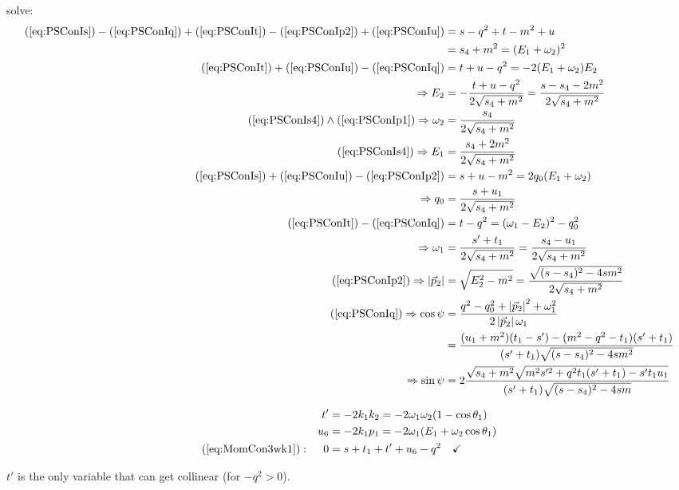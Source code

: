 solve:
\begin{align}
(\ref{eq:PSConIs}) - (\ref{eq:PSConIq}) + (\ref{eq:PSConIt}) - (\ref{eq:PSConIp2}) + (\ref{eq:PSConIu}) &= s-q^2+t-m^2+u\\
 &= s_4+m^2 = (E_1+\omega_2)^2 \label{eq:PSConIs4}\\
(\ref{eq:PSConIt}) + (\ref{eq:PSConIu}) - (\ref{eq:PSConIq}) &= t+u-q^2 = -2(E_1+\omega_2)E_2\\
\Rightarrow E_2 &= -\frac{t+u-q^2}{2\sqrt{s_4+m^2}} =\frac{s-s_4-2m^2}{2\sqrt{s_4+m^2}} \label{eq:PSConIE2}\\
(\ref{eq:PSConIs4})\land (\ref{eq:PSConIp1}) \Rightarrow \omega_2 &= \frac{s_4}{2\sqrt{s_4+m^2}} \label{eq:PSConIom2} \\
(\ref{eq:PSConIs4})\Rightarrow E_1 &= \frac{s_4+2m^2}{2\sqrt{s_4+m^2}} \label{eq:PSConIE1} \\
(\ref{eq:PSConIs})+(\ref{eq:PSConIu})-(\ref{eq:PSConIp2}) &= s+u-m^2 =2q_0(E_1+\omega_2)\\
\Rightarrow q_0 &= \frac{s+u_1}{2\sqrt{s_4+m^2}} \label{eq:PSConIq0}\\
(\ref{eq:PSConIt}) - (\ref{eq:PSConIq}) &= t-q^2 = (\omega_1-E_2)^2 - q_0^2\\
\Rightarrow \omega_1 &= \frac{s'+t_1}{2\sqrt{s_4+m^2}} = \frac{s_4-u_1}{2\sqrt{s_4+m^2}}\label{eq:PSConIom1}\\
(\ref{eq:PSConIp2}) \Rightarrow \left|\vec p_2\right| &= \sqrt{E_2^2 - m^2} = \frac {\sqrt{(s-s_4)^2-4sm^2}} {2\sqrt{s_4+m^2}}\label{eq:PSConIabsp2}\\
(\ref{eq:PSConIq}) \Rightarrow \cos\psi &= \frac{q^2-q_0^2+\left|\vec p_2\right|^2+\omega_1^2}{2\left|\vec p_2\right|\omega_1}\\
 &= \frac {(u_1+m^2)(t_1-s')-(m^2-q^2-t_1)(s'+t_1)} {(s'+t_1)\sqrt{(s-s_4)^2-4sm^2}}\label{eq:PSConIcospsi}\\
\Rightarrow \sin\psi &= 2\frac{\sqrt{s_4+m^2}\sqrt{m^2s'^2+q^2t_1(s'+t_1)-s't_1u_1}}{(s'+t_1)\sqrt{(s-s_4)^2-4sm}}
\end{align}

\begin{align}
&&t' &= -2k_1k_2 = -2\omega_1\omega_2(1-\cos\theta_1)\\
&&u_6 &= - 2k_1p_1 = -2\omega_1(E_1 + \omega_2\cos\theta_1)\\
(\ref{eq:MomCon3wk1}): &&0 &= s+t_1+t'+u_6-q^2\quad\checkmark
\end{align}

$t'$ is the only variable that can get collinear (for $-q^2 > 0$).

